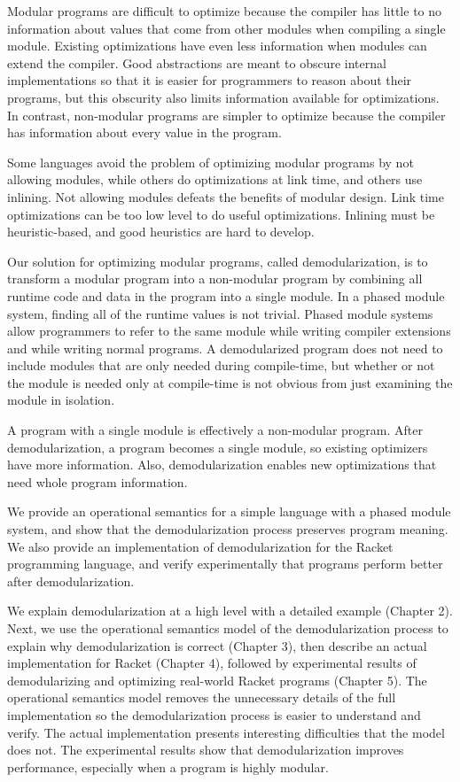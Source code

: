 \documentclass[ms,electronic,letterpaper,lol,lof,lot]{byumsphd}
\begin{document}
Modular programs are difficult to optimize because the compiler has little to no information about values that come from other modules when compiling a single module.
Existing optimizations have even less information when modules can extend the compiler. 
Good abstractions are meant to obscure internal implementations so that it is easier for programmers to reason about their programs, but this obscurity also limits information available for optimizations.  
In contrast, non-modular programs are simpler to optimize because the compiler has information about every value in the program.

Some languages avoid the problem of optimizing modular programs by not allowing modules, while others do optimizations at link time, and others use inlining. 
Not allowing modules defeats the benefits of modular design. 
Link time optimizations can be too low level to do useful optimizations. 
Inlining must be heuristic-based, and good heuristics are hard to develop. 

Our solution for optimizing modular programs, called demodularization, is to transform a modular program into a non-modular program by combining all runtime code and data in the program into a single module.
In a phased module system, finding all of the runtime values is not trivial.
Phased module systems allow programmers to refer to the same module while writing compiler extensions and while writing normal programs.
A demodularized program does not need to include modules that are only needed during compile-time, but whether or not the module is needed only at compile-time is not obvious from just examining the module in isolation. 

A program with a single module is effectively a non-modular program. After demodularization, a program becomes a single module, so existing optimizers have more information. Also, demodularization enables new optimizations that need whole program information. 

We provide an operational semantics for a simple language with a phased module system, and show that the demodularization process preserves program meaning. We also provide an implementation of demodularization for the Racket programming language, and verify experimentally that programs perform better after demodularization.

We explain demodularization at a high level with a detailed example (Chapter 2). Next, we use the operational semantics model of the demodularization process to explain why demodularization is correct (Chapter 3), then describe an actual implementation for Racket (Chapter 4), followed by experimental results of demodularizing and optimizing real-world Racket programs (Chapter 5). The operational semantics model removes the unnecessary details of the full implementation so the demodularization process is easier to understand and verify. The actual implementation presents interesting difficulties that the model does not. The experimental results show that demodularization improves performance, especially when a program is highly modular. 
\end{document}
